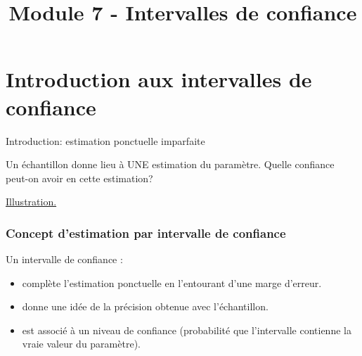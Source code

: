 \documentclass{BeamerTemplate}
\title{Module 7 - Intervalles de confiance}
\begin{document}
\begin{frame}[t]
  \titlepage
\end{frame}






\section{Introduction aux intervalles de confiance}


\begin{frame}[t]{Introduction: estimation ponctuelle imparfaite}

Un échantillon donne lieu à UNE estimation du paramètre. Quelle confiance peut-on avoir en cette estimation?

\vspace{2cm}
\href{https://jmiron-icintro.share.connect.posit.cloud/}{Illustration.}

\end{frame}


\begin{frame}[t]
 \frametitle{Concept d'estimation par intervalle de confiance}

Un intervalle de confiance :
\medskip

    \begin{itemize}\itemsep8mm
    \item complète l'estimation ponctuelle en l'entourant d'une \alert{marge d'erreur}.

    \item donne une idée de la précision obtenue avec l'échantillon.

    \item est associé à un \alert{niveau de confiance} (probabilité que l'intervalle contienne la vraie valeur du paramètre).
    \end{itemize}
\end{frame}

%
%
\end{document}
